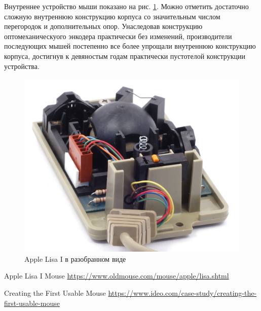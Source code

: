 \documentclass[11pt, a4paper]{article}
\begin{document}
Внутреннее устройство мыши показано на рис. \ref{fig:AppleLisaInside}. Можно отметить достаточно сложную внутреннюю конструкцию корпуса со значительным числом перегородок и дополнительных опор. Унаследовав конструкцию оптомеханическуого энкодера практически без изменений, производители последующих мышей постепенно все более упрощали внутреннюю конструкцию корпуса, достигнув к девяностым годам практически пустотелой конструкции устройства.

 \begin{figure}[h]
    \centering
    \includegraphics[scale=0.6]{1983_apple_lisa_mouse/appleraz_60.jpg}
    \caption{Apple Lisa I в разобранном виде}
    \label{fig:AppleLisaInside}
\end{figure}

\begin{thebibliography}{9}
 Apple Lisa I Mouse \url{https://www.oldmouse.com/mouse/apple/lisa.shtml}

 Creating the First Usable Mouse \url{https://www.ideo.com/case-study/creating-the-first-usable-mouse}
\end{thebibliography}
\end{document}
